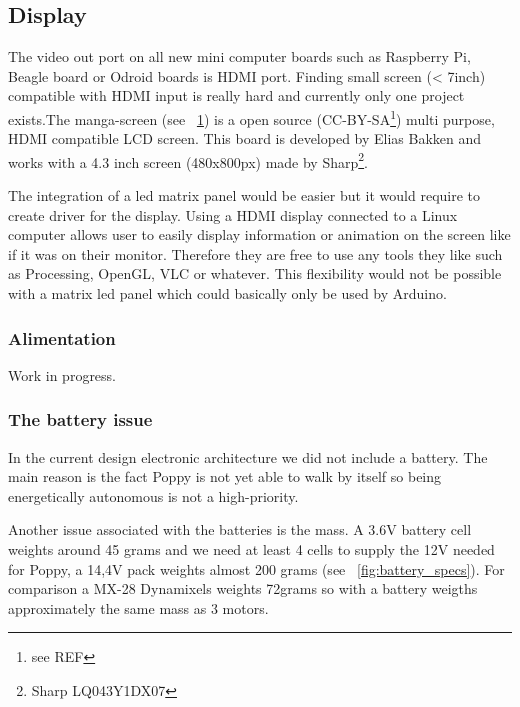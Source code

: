 \subsection{Display} %

The video out port on all new mini computer boards such as Raspberry Pi, Beagle board or Odroid boards is HDMI port. Finding small screen (< 7inch) compatible with HDMI input is really hard and currently only one project exists.The manga-screen (see \figurename~\ref{fig:manga-screen}) is a open source (CC-BY-SA\footnote{see REF}) multi purpose, HDMI compatible LCD screen. This board is developed by Elias Bakken and works with a 4.3 inch screen (480x800px) made by Sharp\footnote{Sharp LQ043Y1DX07}.

\begin{figure}[h]
\centering
    \hfil
    \caption{}
    \label{fig:manga-screen}
\end{figure}

The integration of a led matrix panel would be easier but it would require to create driver for the display.
Using a HDMI display connected to a Linux computer allows user to easily display information or animation on the screen like if it was on their monitor. Therefore they are free to use any tools they like such as Processing, OpenGL, VLC or whatever. This flexibility would not be possible with a matrix led panel which could basically only be used by Arduino.

\subsubsection{Alimentation} %
\label{ssub:alimentation}

Work in progress.


\subsubsection{The battery issue} %
In the current design electronic architecture we did not include a battery. The main reason is the fact Poppy is not yet able to walk by itself so being energetically autonomous is not a high-priority.

Another issue associated with the batteries is the mass. A 3.6V battery cell weights around 45 grams and we need at least 4 cells to supply the 12V needed for Poppy, a 14,4V pack weights almost 200 grams (see \figurename~\ref{fig:battery_specs}). For comparison a MX-28 Dynamixels weights 72grams so with a battery weigths approximately the same mass as 3 motors.

